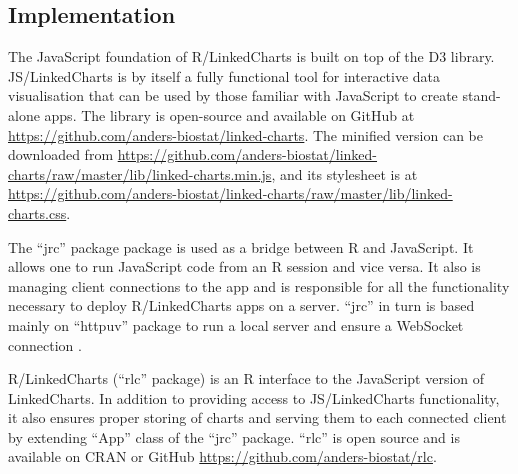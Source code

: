 \documentclass[twocolumn,10pt]{article}
\begin{document}
\subsection{Implementation}

The JavaScript foundation of R/LinkedCharts is built on top of the D3 \citep{bostock_2011} library. JS/LinkedCharts is by itself a fully functional tool for interactive data visualisation that can be used by those familiar with JavaScript to create stand-alone apps. The library is open-source and available on GitHub at \url{https://github.com/anders-biostat/linked-charts}. The minified version can be downloaded from \url{https://github.com/anders-biostat/linked-charts/raw/master/lib/linked-charts.min.js}, and its stylesheet is at \url{https://github.com/anders-biostat/linked-charts/raw/master/lib/linked-charts.css}.

The ``jrc'' package \citep{jrc_2020} package is used as a bridge between R and JavaScript. It allows one to run JavaScript code from an R session and vice versa. It also is managing client connections to the app and is responsible for all the functionality necessary to deploy R/LinkedCharts apps on a server. ``jrc'' in turn is based mainly on ``httpuv'' \citep{cheng_2020} package to run a local server and ensure a WebSocket connection \citep{fette_rfc_2011}. 

R/LinkedCharts (``rlc'' package) is an R \citep{R_2019} interface to the JavaScript version of LinkedCharts. In addition to providing access to JS/LinkedCharts functionality, it also ensures proper storing of charts and serving them to each connected client by extending ``App'' class of the ``jrc'' package. ``rlc'' is open source and is available on CRAN or GitHub \url{https://github.com/anders-biostat/rlc}.

\begin{small} 

\end{small}
\end{document}
